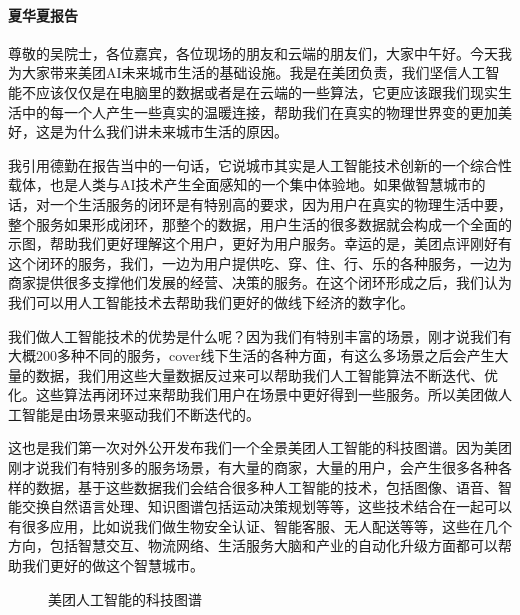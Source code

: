 \documentclass[letterpaper,11pt,english]{sphinxmanual}
\begin{document}
\paragraph{夏华夏报告}
\label{\detokenize{chapter_company/meituan:id6}}
尊敬的吴院士，各位嘉宾，各位现场的朋友和云端的朋友们，大家中午好。今天我为大家带来美团AI未来城市生活的基础设施。我是在美团负责，我们坚信人工智能不应该仅仅是在电脑里的数据或者是在云端的一些算法，它更应该跟我们现实生活中的每一个人产生一些真实的温暖连接，帮助我们在真实的物理世界变的更加美好，这是为什么我们讲未来城市生活的原因。
%
\begin{footnote}[909]\sphinxAtStartFootnote
{}
%
\end{footnote}

我引用德勤在报告当中的一句话，它说城市其实是人工智能技术创新的一个综合性载体，也是人类与AI技术产生全面感知的一个集中体验地。如果做智慧城市的话，对一个生活服务的闭环是有特别高的要求，因为用户在真实的物理生活中要，整个服务如果形成闭环，那整个的数据，用户生活的很多数据就会构成一个全面的示图，帮助我们更好理解这个用户，更好为用户服务。幸运的是，美团点评刚好有这个闭环的服务，我们，一边为用户提供吃、穿、住、行、乐的各种服务，一边为商家提供很多支撑他们发展的经营、决策的服务。在这个闭环形成之后，我们认为我们可以用人工智能技术去帮助我们更好的做线下经济的数字化。

我们做人工智能技术的优势是什么呢？因为我们有特别丰富的场景，刚才说我们有大概200多种不同的服务，cover线下生活的各种方面，有这么多场景之后会产生大量的数据，我们用这些大量数据反过来可以帮助我们人工智能算法不断迭代、优化。这些算法再闭环过来帮助我们用户在场景中更好得到一些服务。所以美团做人工智能是由场景来驱动我们不断迭代的。

这也是我们第一次对外公开发布我们一个全景美团人工智能的科技图谱。因为美团刚才说我们有特别多的服务场景，有大量的商家，大量的用户，会产生很多各种各样的数据，基于这些数据我们会结合很多种人工智能的技术，包括图像、语音、智能交换自然语言处理、知识图谱包括运动决策规划等等，这些技术结合在一起可以有很多应用，比如说我们做生物安全认证、智能客服、无人配送等等，这些在几个方向，包括智慧交互、物流网络、生活服务大脑和产业的自动化升级方面都可以帮助我们更好的做这个智慧城市。

\begin{figure}[H]
\centering
\capstart

\noindent{}
\caption{美团人工智能的科技图谱}\label{\detokenize{chapter_company/meituan:id23}}\end{figure}
\end{document}
